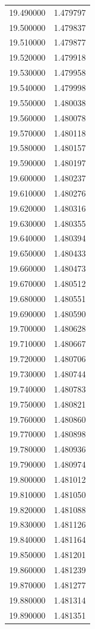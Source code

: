 \begin{tabular}{rr}
19.490000 & 1.479797 \\
19.500000 & 1.479837 \\
19.510000 & 1.479877 \\
19.520000 & 1.479918 \\
19.530000 & 1.479958 \\
19.540000 & 1.479998 \\
19.550000 & 1.480038 \\
19.560000 & 1.480078 \\
19.570000 & 1.480118 \\
19.580000 & 1.480157 \\
19.590000 & 1.480197 \\
19.600000 & 1.480237 \\
19.610000 & 1.480276 \\
19.620000 & 1.480316 \\
19.630000 & 1.480355 \\
19.640000 & 1.480394 \\
19.650000 & 1.480433 \\
19.660000 & 1.480473 \\
19.670000 & 1.480512 \\
19.680000 & 1.480551 \\
19.690000 & 1.480590 \\
19.700000 & 1.480628 \\
19.710000 & 1.480667 \\
19.720000 & 1.480706 \\
19.730000 & 1.480744 \\
19.740000 & 1.480783 \\
19.750000 & 1.480821 \\
19.760000 & 1.480860 \\
19.770000 & 1.480898 \\
19.780000 & 1.480936 \\
19.790000 & 1.480974 \\
19.800000 & 1.481012 \\
19.810000 & 1.481050 \\
19.820000 & 1.481088 \\
19.830000 & 1.481126 \\
19.840000 & 1.481164 \\
19.850000 & 1.481201 \\
19.860000 & 1.481239 \\
19.870000 & 1.481277 \\
19.880000 & 1.481314 \\
19.890000 & 1.481351 \\

\end{tabular}
